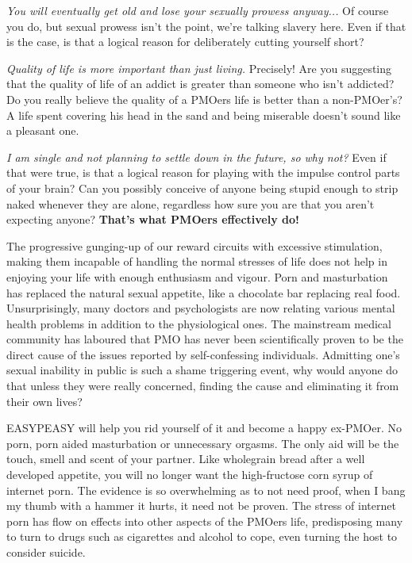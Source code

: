 \documentclass[easypeasy.tex]{subfiles}
\begin{document}
  \textit{You will eventually get old and lose your sexually prowess anyway...}
  Of course you do, but sexual prowess isn't the point, we're talking slavery here. Even if that is the case, is that a logical reason for deliberately cutting yourself short?

  \textit{Quality of life is more important than just living.}
  Precisely! Are you suggesting that the quality of life of an addict is greater than someone who isn't addicted? Do you really believe the quality of a PMOers life is better than a non-PMOer's? A life spent covering his head in the sand and being miserable doesn't sound like a pleasant one.

  \textit{I am single and not planning to settle down in the future, so why not?}
  Even if that were true, is that a logical reason for playing with the impulse control parts of your brain? Can you possibly conceive of anyone being stupid enough to strip naked whenever they are alone, regardless how sure you are that you aren't expecting anyone? \textbf{That's what PMOers effectively do!}

The progressive gunging-up of our reward circuits with excessive stimulation, making them incapable of handling the normal stresses of life does not help in enjoying your life with enough enthusiasm and vigour. Porn and masturbation has replaced the natural sexual appetite, like a chocolate bar replacing real food. Unsurprisingly, many doctors and psychologists are now relating various mental health problems in addition to the physiological ones. The mainstream medical community has laboured that PMO has never been scientifically proven to be the direct cause of the issues reported by self-confessing individuals. Admitting one's sexual inability in public is such a shame triggering event, why would anyone do that unless they were really concerned, finding the cause and eliminating it from their own lives?

EASYPEASY will help you rid yourself of it and become a happy ex-PMOer. No porn, porn aided masturbation or unnecessary orgasms. The only aid will be the touch, smell and scent of your partner. Like wholegrain bread after a well developed appetite, you will no longer want the high-fructose corn syrup of internet porn. The evidence is so overwhelming as to not need proof, when I bang my thumb with a hammer it hurts, it need not be proven. The stress of internet porn has flow on effects into other aspects of the PMOers life, predisposing many to turn to drugs such as cigarettes and alcohol to cope, even turning the host to consider suicide.
\end{document}
